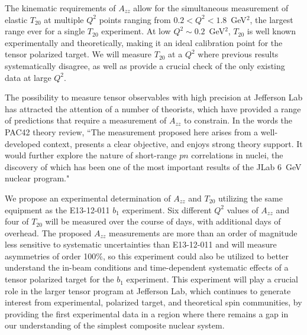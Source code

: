 The kinematic requirements of $A_{zz}$ allow for the simultaneous measurement of elastic $T_{20}$ at multiple $Q^2$ points ranging from $0.2<Q^2<1.8$~GeV$^2$, the largest range ever for a single $T_{20}$ experiment. At low $Q^2\sim0.2$~GeV$^2$, $T_{20}$ is well known experimentally and theoretically, making it an ideal calibration point for the tensor polarized target. We will measure $T_{20}$ at a $Q^2$ where previous results systematically disagree, as well as provide a crucial check of the only existing data at large $Q^2$.



The possibility to measure tensor observables with high precision at Jefferson Lab has attracted the attention of a number of theorists, which have provided a range of predictions that require a measurement of $A_{zz}$ to constrain. 
In the words the PAC42 theory review, ``The measurement proposed here arises from a well-developed context, presents a clear objective, and enjoys strong theory support. It would further explore the nature of short-range $pn$ correlations in nuclei, the discovery of which has been one of the most important results of the JLab 6~GeV nuclear program." 

We propose an experimental determination of $A_{zz}$ and $T_{20}$ utilizing the same equipment as the E13-12-011 $b_1$ experiment.  Six different $Q^2$ values of $A_{zz}$ and four of $T_{20}$ will be measured over the course of \productiondays days, with \overheaddays additional days of overhead. The proposed $A_{zz}$ measurements are more than an order of magnitude less sensitive to systematic uncertainties than E13-12-011 and will measure asymmetries of order 100\%, so this experiment could also be utilized to better understand the in-beam conditions and time-dependent systematic effects of a tensor polarized target for the $b_1$ experiment. This experiment will play a crucial role in the larger tensor program at Jefferson Lab, which continues to generate interest from experimental, polarized target, and theoretical spin communities, by providing the first experimental data in a region where there remains a gap in our understanding of the simplest composite nuclear system.








